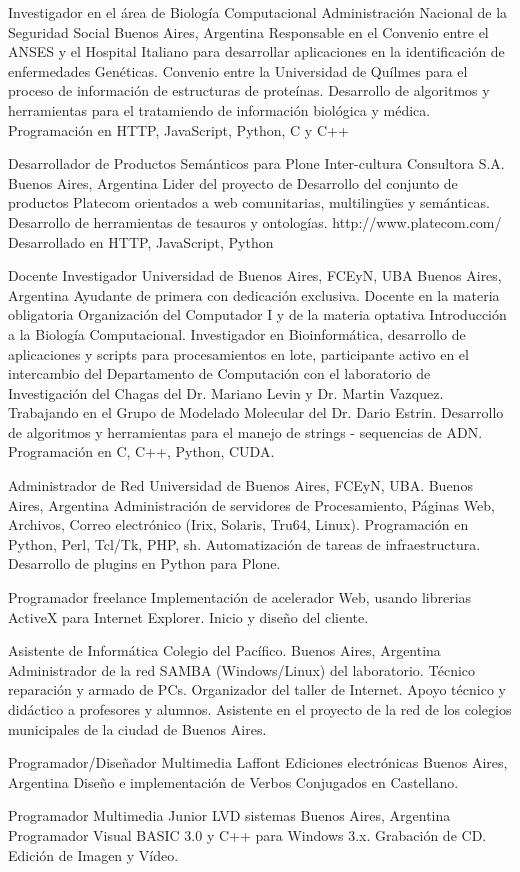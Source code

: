 	{Investigador en el área de Biología Computacional}
	{Administración Nacional de la Seguridad Social}
	{Buenos Aires, Argentina}
	{}
	{Responsable en el Convenio entre el ANSES y el Hospital Italiano para desarrollar
	aplicaciones en la identificación de enfermedades Genéticas. Convenio entre la
	Universidad de Quílmes para el proceso de información de estructuras de proteínas.
        Desarrollo de algoritmos y herramientas para el tratamiendo de información biológica y médica.
        Programación en HTTP, JavaScript, Python, C y C++}

	{Desarrollador de Productos Semánticos para Plone}
	{Inter-cultura Consultora S.A.}
	{Buenos Aires, Argentina}
	{}
	{Lider del proyecto de Desarrollo del conjunto de productos Platecom
	orientados a web comunitarias, multilingües y semánticas. Desarrollo
	de herramientas de tesauros y ontologías. http://www.platecom.com/
        Desarrollado en HTTP, JavaScript, Python}

	{Docente Investigador}
	{Universidad de Buenos Aires, FCEyN, UBA}
	{Buenos Aires, Argentina}
	{}
	{Ayudante de primera con dedicación exclusiva.
	Docente en la materia obligatoria Organización del Computador I y de la
	materia optativa Introducción a la Biología Computacional.
	Investigador en Bioinformática, desarrollo de aplicaciones y scripts para
	procesamientos en lote, participante activo en el intercambio del Departamento
	de Computación con el laboratorio de Investigación del Chagas del
	Dr. Mariano Levin y Dr. Martin Vazquez. Trabajando en el Grupo de Modelado Molecular
	del Dr. Dario Estrin.
        Desarrollo de algoritmos y herramientas para el manejo de strings - sequencias de ADN.
        Programación en C, C++, Python, CUDA.}

	{Administrador de Red}
	{Universidad de Buenos Aires, FCEyN, UBA.}
	{Buenos Aires, Argentina}
	{}
	{Administración de servidores de Procesamiento, Páginas Web,
	Archivos, Correo electrónico (Irix, Solaris, Tru64, Linux).
	Programación en Python, Perl, Tcl/Tk, PHP, sh.
	Automatización de tareas de infraestructura.
        Desarrollo de plugins en Python para Plone.}

	{Programador freelance}
	{}
	{}
	{}
	{Implementación de acelerador Web, usando librerias ActiveX para Internet Explorer. Inicio y diseño del cliente.}

	{Asistente de Informática}
	{Colegio del Pacífico.}
	{Buenos Aires, Argentina}
	{}
	{Administrador de la red SAMBA (Windows/Linux) del
	laboratorio. Técnico reparación y armado de PCs. Organizador del taller de
	Internet. Apoyo técnico y didáctico a profesores y alumnos. Asistente en el
	proyecto de la red de los colegios municipales de la ciudad de Buenos Aires.}

	{Programador/Diseñador Multimedia}
	{Laffont Ediciones electrónicas}
	{Buenos Aires, Argentina}
	{}
	{Diseño e implementación de Verbos Conjugados en Castellano.}

	{Programador Multimedia Junior}
	{LVD sistemas}
	{Buenos Aires, Argentina}
	{}
	{Programador Visual BASIC 3.0 y C++ para Windows 3.x. Grabación de CD. Edición de Imagen y Vídeo.}


